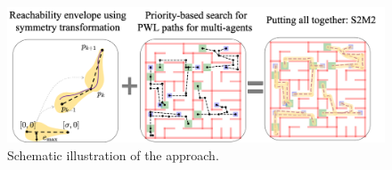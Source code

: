 \documentclass[letterpaper]{article} %
\theoremstyle{definition}
\begin{document}




 
 
\begin{figure}[t]
\centering
\includegraphics[width=0.99\columnwidth]{overview.png}
\caption{Schematic illustration of the approach.}
\label{fig:diagram}

\end{figure}

 


\end{document}
